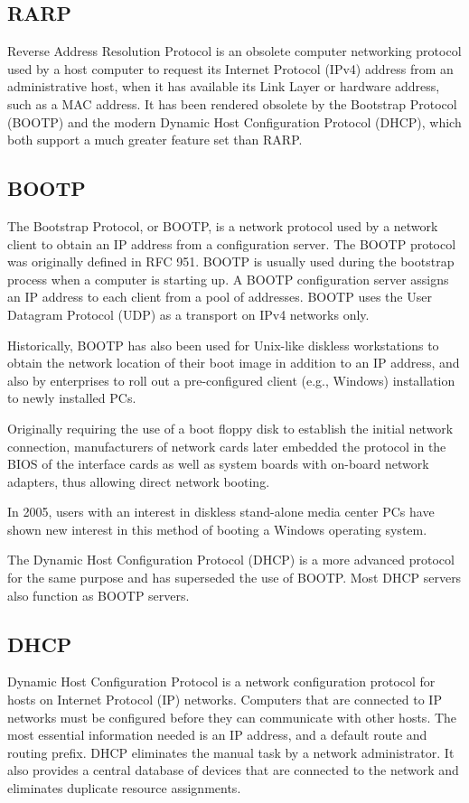 \documentclass[a4paper,oneside]{report}
\begin{document}
    	\subsection{RARP}
	Reverse Address Resolution Protocol is an obsolete computer networking protocol used by a host computer to request its       	Internet Protocol (IPv4) address from an administrative host, when it has available its Link Layer or hardware address, such as a MAC address.
	 It has been rendered obsolete by the Bootstrap Protocol (BOOTP) and the modern Dynamic Host Configuration Protocol (DHCP), which both support a much greater feature set than RARP.

    	\subsection{BOOTP}

	The Bootstrap Protocol, or BOOTP, is a network protocol used by a network client to obtain an IP address from a configuration server. The BOOTP protocol was originally defined in RFC 951.
	BOOTP is usually used during the bootstrap process when a computer is starting up. A BOOTP configuration server assigns an IP address to each client from a pool of addresses. BOOTP uses the User Datagram Protocol (UDP) as a transport on IPv4 networks only.	

	Historically, BOOTP has also been used for Unix-like diskless workstations to obtain the network location of their boot image in addition to an IP address, and also by enterprises to roll out a pre-configured client (e.g., Windows) installation to newly installed PCs.

	 Originally requiring the use of a boot floppy disk to establish the initial network connection, manufacturers of network cards later embedded the protocol in the BIOS of the interface cards as well as system boards with on-board network adapters, thus allowing direct network booting.

	 In 2005, users with an interest in diskless stand-alone media center PCs have shown new interest in this method of booting a Windows operating system.

 	The Dynamic Host Configuration Protocol (DHCP) is a more advanced protocol for the same purpose and has superseded the use of BOOTP. Most DHCP servers also function as BOOTP servers.
    	

	\subsection{DHCP}
	Dynamic Host Configuration Protocol  is a network configuration protocol for hosts on Internet Protocol (IP) networks. Computers that are connected to IP networks must be configured before they can communicate with other hosts. The most essential information needed is an IP address, and a default route and routing prefix. DHCP eliminates the manual task by a network administrator. It also provides a central database of devices that are connected to the network and eliminates duplicate resource assignments.
\end{document}
